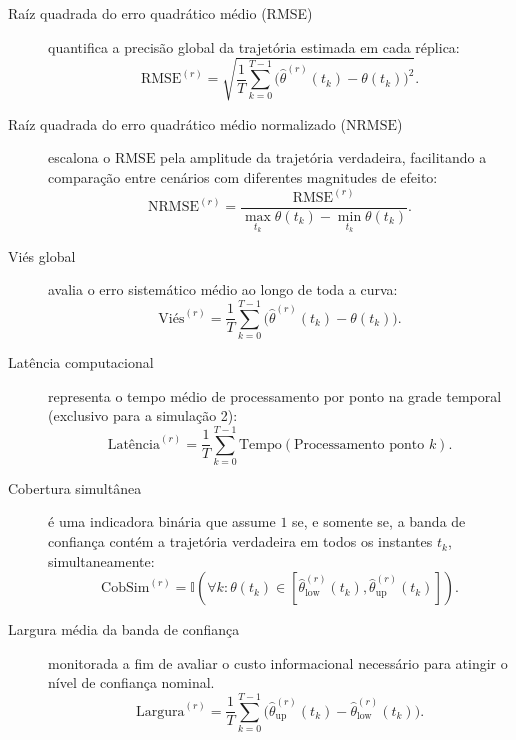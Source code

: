 \begin{description}
	\item[Raíz quadrada do erro quadrático médio (RMSE)] quantifica a precisão global da trajetória estimada em cada réplica:
	\begin{equation*}
		\mathrm{RMSE}^{(r)} = \sqrt{\frac{1}{T}\sum_{k=0}^{T-1} \bigl(\hat{\theta}^{(r)}(t_k) - \theta(t_k)\bigr)^2}.
	\end{equation*}
	\item[Raíz quadrada do erro quadrático médio normalizado (\(\mathrm{NRMSE}\))] escalona o \(\mathrm{RMSE}\) pela amplitude da trajetória verdadeira, facilitando a comparação entre cenários com diferentes magnitudes de efeito:
	\begin{equation*}
		\mathrm{NRMSE}^{(r)} = \frac{\text{RMSE}^{(r)}}{\max_{t_k} \theta(t_k) - \min_{t_k} \theta(t_k)}.
	\end{equation*}
	\item[Viés global] avalia o erro sistemático médio ao longo de toda a curva:
	\begin{equation*}
		\text{Viés}^{(r)} = \frac{1}{T}\sum_{k=0}^{T-1} \bigl(\hat{\theta}^{(r)}(t_k) - \theta(t_k)\bigr).
	\end{equation*}
	\item[Latência computacional] representa o tempo médio de processamento por ponto na grade temporal (exclusivo para a simulação 2):
	\begin{equation*}
		\text{Latência}^{(r)} = \frac{1}{T}\sum_{k=0}^{T-1} \text{Tempo}(\text{Processamento ponto } k).
	\end{equation*}
	\item[Cobertura simultânea] é uma indicadora binária que assume \(1\) se, e somente se, a banda de confiança contém a trajetória verdadeira em todos os instantes \(t_k\), simultaneamente:
	\begin{equation*}
		\mathrm{CobSim}^{(r)} = \mathbb{I}\left( \forall k : \theta(t_k) \in [\hat{\theta}_{\text{low}}^{(r)}(t_k), \hat{\theta}_{\text{up}}^{(r)}(t_k)] \right).
	\end{equation*}
	\item[Largura média da banda de confiança] monitorada a fim de avaliar o custo informacional necessário para atingir o nível de confiança nominal.
	\begin{equation*}
		\mathrm{Largura}^{(r)} = \frac{1}{T}\sum_{k=0}^{T-1} \bigl(\hat{\theta}_{\text{up}}^{(r)}(t_k) - \hat{\theta}_{\text{low}}^{(r)}(t_k)\bigr).
	\end{equation*}

\end{description}
